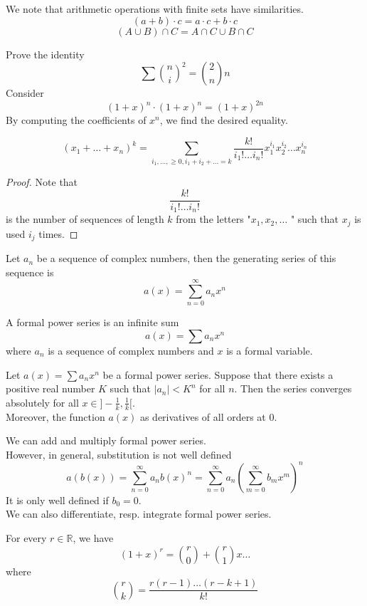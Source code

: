 \documentclass[../main.tex]{subfiles}
\begin{document}
We note that arithmetic operations with finite sets have similarities.
\[ 
	( a+b) \cdot c = a\cdot c + b \cdot c
\]
\[ 
	( A \cup B ) \cap C = A \cap C \cup B \cap C
\]
\begin{exemple}
Prove the identity
\[ 
	\sum \binom n i ^{2} = \binom 2n n
\]
Consider
\[ 
	( 1+x) ^{n} \cdot ( 1+x) ^{n}= ( 1+x) ^{2n}
\]
By computing the coefficients of $x^{n}$, we find the desired equality.

\end{exemple}
\begin{thm}
	\[ 
		( x_1 + \ldots + x_n) ^{k} = \sum_{i_1, \ldots, \geq 0, i_1 + i_2 + \ldots =k} \frac{k!}{i_1! \ldots i_n!}x_1^{i_1}x_2 ^{i_2} \ldots x_n^{i_n}
	\]
	
	
\end{thm}
\begin{proof}
Note that
\[ 
\frac{k!}{i_1! \ldots i_n!}
\]
is the number of sequences of length $k$ from the letters "$x_1, x_2,\ldots$ " such that $x_j$ is used $i_j$ times.
\end{proof}
\begin{defn}
	Let $a_n$ be a sequence of complex numbers, then the generating series of this sequence is
	\[ 
		a( x) = \sum_{n=0}^{ \infty }a_n x^{n}
	\]
\end{defn}
\begin{defn}
	A formal power series is an infinite sum
	\[ 
		a( x) = \sum a_n x^{n}
	\]
	where $a_n$ is a sequence of complex numbers and $x$ is a formal variable.
	
\end{defn}
\begin{propo}
	Let $a( x) = \sum a_n x^{n} $ be a formal power series. Suppose that there exists a positive real number $K$ such that $|a_n| < K^{n}$ for all $n$. Then the series converges absolutely for all $x \in ]-\frac{1}{k}, \frac{1}{k}[$.\\
	Moreover, the function $a( x) $ as derivatives of all orders at $0$.
\end{propo}
We can add and multiply formal power series.\\
However, in general, substitution is not well defined
\[ 
	a( b( x) ) = \sum_{n=0}^{ \infty }a_n b( x)^{n} = \sum_{n=0}^{ \infty }a_n ( \sum_{m=0}^{ \infty }b_m x^{m}) ^{n}
\]
It is only well defined if $b_0=0$.\\
We can also differentiate, resp. integrate formal power series.
\begin{thm}
	For every $r \in \mathbb{R}$, we have
	\[ 
		( 1+x)^{r}= \binom r 0  + \binom r 1 x \ldots
	\]
	where 
	\[ 
		\binom r k = \frac{r ( r-1) \ldots ( r-k+1)  }{k!}
	\]
	
	
\end{thm}
\end{document}
